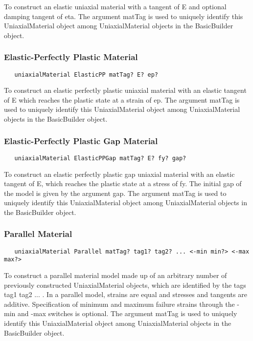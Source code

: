 \documentclass[12pt]{article}
\begin{document}
\noindent To construct an elastic uniaxial material with a tangent of E
and optional damping tangent of eta. The argument matTag is used to
uniquely identify this UniaxialMaterial object among UniaxialMaterial objects
in the BasicBuilder object.

\subsubsection{Elastic-Perfectly Plastic Material}
{\sf\small
\begin{verbatim}
   uniaxialMaterial ElasticPP matTag? E? ep?
\end{verbatim}
}

\noindent To construct an elastic perfectly plastic uniaxial material
with an elastic tangent of E which
reaches the plastic state at a strain of ep. The argument matTag is used to
uniquely identify this UniaxialMaterial object among UniaxialMaterial objects
in the BasicBuilder object.

\subsubsection{Elastic-Perfectly Plastic Gap Material}
{\sf\small
\begin{verbatim}
   uniaxialMaterial ElasticPPGap matTag? E? fy? gap?
\end{verbatim}
}

\noindent To construct an elastic perfectly plastic gap uniaxial material
with an elastic tangent of E, which reaches the plastic state at a stress 
of fy. The initial gap of the model is given by the argument gap. The argument
matTag is used to uniquely identify this UniaxialMaterial object among
UniaxialMaterial objects in the BasicBuilder object.

\subsubsection{Parallel Material}
{\sf\small
\begin{verbatim}
   uniaxialMaterial Parallel matTag? tag1? tag2? ... <-min min?> <-max max?>
\end{verbatim}
}

\noindent To construct a parallel material model made up of an
arbitrary number of previously constructed UniaxialMaterial objects, 
which are identified by the tags tag1 tag2 ... . In a parallel model,
strains are equal and stresses and tangents are additive. Specification of
minimum and maximum failure strains through the -min and -max switches
is optional. The argument matTag is used to
uniquely identify this UniaxialMaterial object among UniaxialMaterial objects
in the BasicBuilder object.
\end{document}
